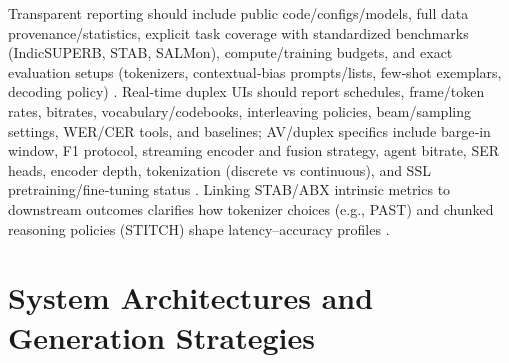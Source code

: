 \documentclass{article}
\begin{document}
Transparent reporting should include public code/configs/models, full data provenance/statistics, explicit task coverage with standardized benchmarks (IndicSUPERB, STAB, SALMon), compute/training budgets, and exact evaluation setups (tokenizers, contextual‑bias prompts/lists, few‑shot exemplars, decoding policy) \cite{vashishth2024stabspeechtokenizerassessmentbenchmark,entry2025indicsuperbspeechprocessinguniversalperf,maimon2025salmonsuiteacousticlanguagemodelevaluati,chen2023reducingbarriersselfsupervisedlearninghu,sun2023contextualbiasingnamedentitieslargelangu}. Real‑time duplex UIs should report schedules, frame/token rates, bitrates, vocabulary/codebooks, interleaving policies, beam/sampling settings, WER/CER tools, and baselines; AV/duplex specifics include barge‑in window, F1 protocol, streaming encoder and fusion strategy, agent bitrate, SER heads, encoder depth, tokenization (discrete vs continuous), and SSL pretraining/fine‑tuning status \cite{yang2024buildingtaiwanesemandarinspokenlanguagem,wang2023slmbridgethingapbetweenspeechtextfoundat,maimon2025salmonsuiteacousticlanguagemodelevaluati,entry2025indicsuperbspeechprocessinguniversalperf,li2025continuousspeechtokenizertext,hu2025salmduplexefficientdirectmodelingspeechl,chen2023reducingbarriersselfsupervisedlearninghu}. Linking STAB/ABX intrinsic metrics to downstream outcomes clarifies how tokenizer choices (e.g., PAST) and chunked reasoning policies (STITCH) shape latency–accuracy profiles \cite{har-tuv2025pastphoneticacousticspeechtokenizer,fily2024establishingdegreesclosenessbetweenaudio,vashishth2024stabspeechtokenizerassessmentbenchmark,entry2025indicsuperbspeechprocessinguniversalperf,chiang2025stitchsimultaneousthinkingtalkingchunked}.

















\section{System Architectures and Generation Strategies} \label{sec:System Architectures and Generation Strategies}
\end{document}
